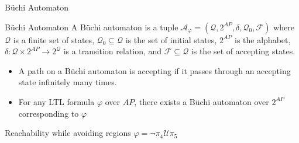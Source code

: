 \documentclass{beamer}
\newcommand{\U}{\bm{\mathcal{U}}}
\begin{document}
\begin{frame}{B\"uchi Automaton}
\begin{block}{B\"uchi Automaton}
	\small A B\"uchi automaton is a tuple $\mathcal{A}_\varphi = (\mathcal{Q},2^{AP},\delta,\mathcal{Q}_0,\mathcal{F})$ where $\mathcal{Q}$ is a finite set of states, $\mathcal{Q}_0 \subseteq \mathcal{Q}$ is the set of initial states, $2^{AP}$ is the alphabet, $\delta: \mathcal{Q} \times 2^{AP} \rightarrow 2^\mathcal{Q}$ is a transition relation, and $\mathcal{F} \subseteq \mathcal{Q}$ is the set of accepting states.
	\end{block}

	\begin{itemize}
	\item {
	A path on a B\"uchi automaton is accepting if it passes through an accepting state infinitely many times.
	}
	\item {
	For any LTL formula $\varphi$ over $AP$, there exists a B\"uchi automaton over $2^{AP}$ corresponding to $\varphi$ \cite{baier08}
	}
	\end{itemize}
	\pause
	Reachability while avoiding regions $\varphi = \neg \pi_4 \U \pi_5$
	
	\begin{figure}
\centering
{}
\end{figure}
\end{frame}
\end{document}
